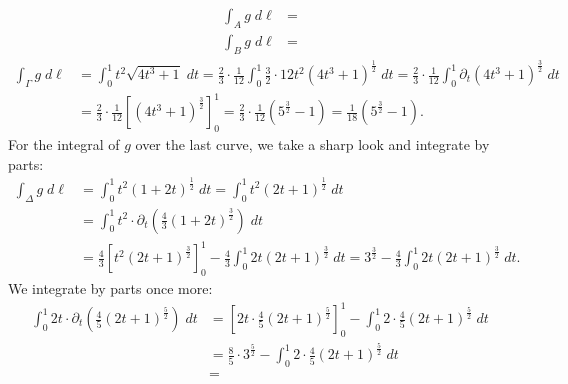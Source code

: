 \documentclass[11pt]{article}
\begin{document}
\begin{solution}     
    
    \begin{align*}
        \int_A g \;d\ell
        &=
    \end{align*}
    \begin{align*}
        \int_B g \;d\ell
        &=
    \end{align*}
    \begin{align*}
        \int_\Gamma g \;d\ell
        &=
        \int_0^1 t^2 \sqrt{ 4t^3 + 1 } \;dt
        =
        \frac 2 3 \cdot \frac 1 {12} \int_0^1 \frac 3 2 \cdot 12 t^2 \left( 4t^3 + 1 \right)^{\frac 1 2} \;dt
        =
        \frac 2 3 \cdot \frac 1 {12} \int_0^1 \partial_t \left( 4t^3 + 1 \right)^{\frac 3 2} \;dt
        \\&=
        \frac 2 3 \cdot \frac 1 {12} \left[ \left( 4t^3 + 1 \right)^{\frac 3 2} \right]_0^1
        =
        \frac 2 3 \cdot \frac 1 {12} \left( 5^{\frac 3 2} - 1 \right)
        =
        \frac 1 {18} \left( 5^{\frac 3 2} - 1 \right)
        .
    \end{align*}
    For the integral of $g$ over the last curve, we take a sharp look and integrate by parts:
    \begin{align*}
        \int_\Delta g \;d\ell
        &=
        \int_0^1 t^2 \left( 1 + 2t \right)^{\frac 1 2} \;dt
        =
        \int_0^1 t^2 \left( 2t + 1 \right)^{\frac 1 2} \;dt
        \\&=
        \int_0^1 t^2 \cdot \partial_t\left( \frac 4 3 \left( 1 + 2t \right)^{\frac 3 2} \right) \;dt
        \\&=
        \frac 4 3 \left[ t^2 \left( 2t + 1 \right)^{\frac 3 2} \right]_0^1
        -
        \frac 4 3 \int_0^1 2t \left( 2t + 1 \right)^{\frac 3 2} \;dt
        =
        3^{\frac 3 2}
        -
        \frac 4 3 \int_0^1 2t \left( 2t + 1 \right)^{\frac 3 2} \;dt
        .
    \end{align*}
    We integrate by parts once more:
    \begin{align*}
        \int_0^1 2t \cdot \partial_t\left( \frac 4 5 \left( 2t + 1 \right)^{\frac 5 2} \right) \;dt
        &=
        \left[ 2t \cdot \frac 4 5 \left( 2t + 1 \right)^{\frac 5 2} \right]_0^1
        -
        \int_0^1 2 \cdot \frac 4 5 \left( 2t + 1 \right)^{\frac 5 2} \;dt
        \\&=
        \frac 8 5 \cdot 3^{\frac 5 2}
        -
        \int_0^1 2 \cdot \frac 4 5 \left( 2t + 1 \right)^{\frac 5 2} \;dt
        \\&=

\end{align*}
\end{solution}
\end{document}
